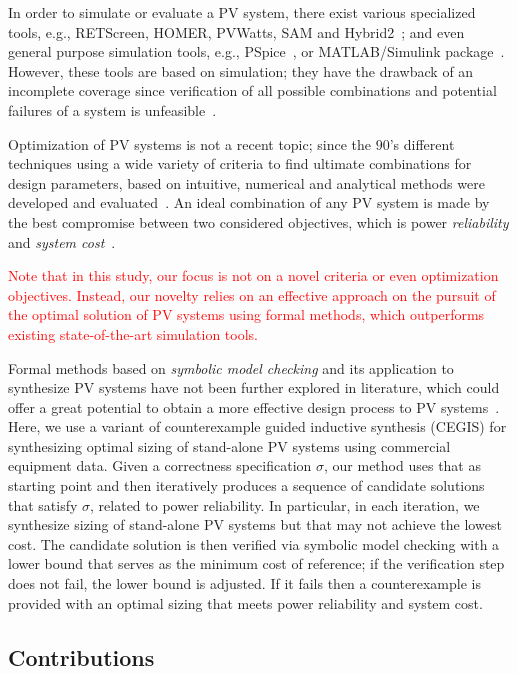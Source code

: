 \documentclass[review]{elsarticle}
\begin{document}
In order to simulate or evaluate a PV system, there exist various specialized tools, e.g., RETScreen, HOMER, PVWatts, SAM and  Hybrid2~\cite{Pradhan,Swarnkar,NRELDobos,NRELBlair,Mills}; and even general purpose simulation tools, e.g.,  PSpice~\cite{Gow1999}, or MATLAB/Simulink package~\cite{Benatiallah2017}. However, these tools are based on simulation; they have the drawback of an incomplete coverage  since verification of all possible combinations and potential failures of a system is unfeasible~\cite{ClarkeHV18}. 

Optimization of PV systems is not a recent topic; since the $90$'s different techniques using a wide variety of criteria to find ultimate combinations for design parameters, based on intuitive, numerical and analytical methods were developed and evaluated~\cite{Applasamy2011}. An ideal combination of any PV system is made by the best compromise between two considered objectives, which is power \textit{reliability} and \textit{system cost}~\cite{Alsadi2018}.
 
\textcolor{red}{Note that in this study, our focus is not on a novel criteria or even optimization objectives. Instead, our novelty relies on an effective approach on the pursuit of the optimal solution of PV systems using formal methods, which outperforms existing state-of-the-art simulation tools.}

Formal methods based on \textit{symbolic model checking} and its application 
to synthesize PV systems have not been further explored in literature, which could offer 
a great potential to obtain a more effective design process to PV systems~\cite{ClarkeHV18}. 
Here, we use a variant of counterexample guided inductive synthesis (CEGIS) for synthesizing 
optimal sizing of stand-alone PV systems using commercial equipment data. 
Given a correctness specification $\sigma$, our method uses that as starting point 
and then iteratively produces a sequence of candidate solutions that satisfy $\sigma$, 
related to power reliability. In particular, in each iteration, we synthesize sizing of 
stand-alone PV systems but that may not achieve the lowest cost. The candidate solution 
is then verified via symbolic model checking with a lower bound that serves as the minimum 
cost of reference; if the verification step does not fail, the lower bound is adjusted. 
If it fails then a counterexample is provided with an optimal sizing that meets 
power reliability and system cost.

\subsection{Contributions}
\end{document}
